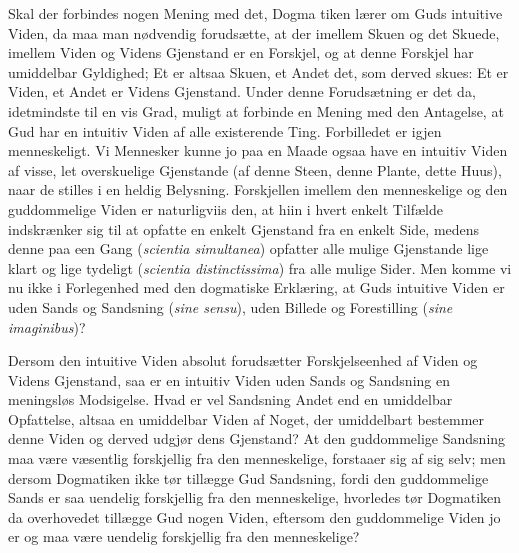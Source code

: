 \documentclass[11pt]{book}
\newcommand{\opage}[1]{\marginnote{\footnotesize\textit{[#1]}}}
\begin{document}
Skal der forbindes nogen Mening med det, Dogma\-%
\opage{238} %
\setcounter{footnote}{0}%
tiken lærer om Guds intuitive Viden, da maa man nødvendig forudsætte, at
der imellem Skuen og det Skuede, imellem Viden og Videns Gjenstand er en
Forskjel, og at denne Forskjel har umiddelbar Gyldighed; Et er altsaa
Skuen, et Andet det, som derved skues: Et er Viden, et Andet er Videns
Gjenstand. Under denne Forudsætning er det da, idetmindste til en vis
Grad, muligt at forbinde en Mening med den Antagelse, at Gud har en
intuitiv Viden af alle existerende Ting. Forbilledet er igjen
menneskeligt. Vi Mennesker kunne jo paa en Maade ogsaa have en intuitiv
Viden af visse, let overskuelige Gjenstande (af denne Steen, denne
Plante, dette Huus), naar de stilles i en heldig Belysning. Forskjellen
imellem den menneskelige og den guddommelige Viden er naturligviis den,
at hiin i hvert enkelt Tilfælde indskrænker sig til at opfatte en enkelt
Gjenstand fra en enkelt Side, medens denne paa een Gang
(\textit{scientia simultanea}) opfatter alle mulige Gjenstande lige
klart og lige tydeligt (\textit{scientia distinctissima}) fra alle
mulige Sider. Men komme vi nu ikke i Forlegenhed med den dogmatiske
Erklæring, at Guds intuitive Viden er uden Sands og Sandsning
(\textit{sine sensu}), uden Billede og Forestilling (\textit{sine
imaginibus})?

Dersom den intuitive Viden absolut forudsætter Forskjelseenhed af Viden
og Videns Gjenstand, saa er en intuitiv Viden uden Sands og Sandsning en
meningsløs Modsigelse. Hvad er vel Sandsning Andet end en umiddelbar
Opfattelse, altsaa en umiddelbar Viden af Noget, der umiddelbart
bestemmer denne Viden og derved udgjør dens Gjenstand? At den
guddommelige Sandsning maa være væsentlig forskjellig fra den
menneskelige, forstaaer sig af sig selv; men dersom Dogmatiken ikke tør
tillægge Gud Sandsning, fordi den guddommelige Sands er saa uendelig
forskjellig fra den menneskelige, hvorledes tør Dogmatiken da
overhovedet tillægge Gud
\opage{239} \setcounter{footnote}{0}%
nogen Viden, eftersom den guddommelige Viden jo er og maa være uendelig
forskjellig fra den menneskelige?
\end{document}
